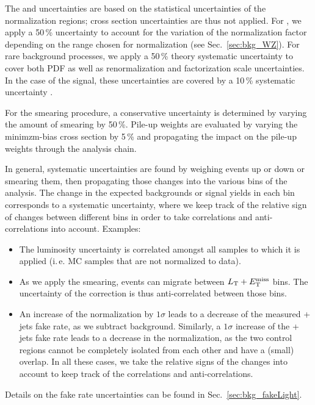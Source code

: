 The \ZZ and \ttbar uncertainties are based on the statistical uncertainties of the normalization regions; cross section uncertainties are thus not applied. For \WZ, we apply a 50\,\% uncertainty to account for the variation of the normalization factor depending on the \MET range chosen for normalization (see Sec.~\ref{sec:bkg_WZ}). For rare background processes, we apply a 50\,\% theory systematic uncertainty to cover both PDF as well as renormalization and factorization scale uncertainties. In the case of the signal, these uncertainties are covered by a 10\,\% systematic uncertainty \cite{CMS-PAS-EXO-14-001}.

For the \MET smearing procedure, a conservative uncertainty is determined by varying the amount of smearing by 50\,\%. Pile-up weights are evaluated by varying the minimzm-bias cross section by 5\,\% and propagating the impact on the pile-up weights through the analysis chain.

In general, systematic uncertainties are found by weighing events up or down or smearing them, then propagating those changes into the various bins of the analysis. The change in the expected backgrounds or signal yields in each bin corresponds to a systematic uncertainty, where we keep track of the relative sign of changes between different bins in order to take correlations and anti-correlations into account. Examples:
\begin{itemize}
	\item The luminosity uncertainty is correlated amongst all samples to which it is applied (i.\,e. MC samples that are not normalized to data). 
	\item As we apply the \MET smearing, events can migrate between $L_\textrm{T} + E_{\mathrm{T}}^{\text{miss}}$ bins. The uncertainty of the correction is thus anti-correlated between those bins. 
	\item An increase of the \WZ normalization by $1\sigma$ leads to a decrease of the measured \Z + jets fake rate, as we subtract \WZ background. Similarly, a $1\sigma$ increase of the \Z + jets fake rate leads to a decrease in the \WZ normalization, as the two control regions cannot be completely isolated from each other and have a (small) overlap. In all these cases, we take the relative signs of the changes into account to keep track of the correlations and anti-correlations.
\end{itemize}

Details on the fake rate uncertainties can be found in Sec.~\ref{sec:bkg_fakeLight}.
